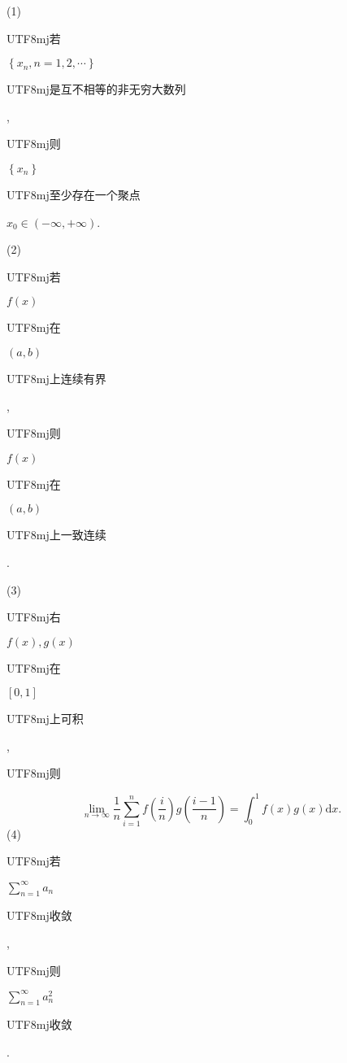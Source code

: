 \documentclass[10pt]{article}
\begin{document}
(1) \begin{CJK}{UTF8}{mj}若\end{CJK} $\left\{x_{n}, n=1,2, \cdots\right\}$ \begin{CJK}{UTF8}{mj}是互不相等的非无穷大数列\end{CJK}, \begin{CJK}{UTF8}{mj}则\end{CJK} $\left\{x_{n}\right\}$ \begin{CJK}{UTF8}{mj}至少存在一个聚点\end{CJK} $x_{0} \in(-\infty,+\infty)$.

(2) \begin{CJK}{UTF8}{mj}若\end{CJK} $f(x)$ \begin{CJK}{UTF8}{mj}在\end{CJK} $(a, b)$ \begin{CJK}{UTF8}{mj}上连续有界\end{CJK}, \begin{CJK}{UTF8}{mj}则\end{CJK} $f(x)$ \begin{CJK}{UTF8}{mj}在\end{CJK} $(a, b)$ \begin{CJK}{UTF8}{mj}上一致连续\end{CJK}.

(3) \begin{CJK}{UTF8}{mj}右\end{CJK} $f(x), g(x)$ \begin{CJK}{UTF8}{mj}在\end{CJK} $[0,1]$ \begin{CJK}{UTF8}{mj}上可积\end{CJK}, \begin{CJK}{UTF8}{mj}则\end{CJK}
$$
\lim _{n \rightarrow \infty} \frac{1}{n} \sum_{i=1}^{n} f\left(\frac{i}{n}\right) g\left(\frac{i-1}{n}\right)=\int_{0}^{1} f(x) g(x) \mathrm{d} x .
$$
(4) \begin{CJK}{UTF8}{mj}若\end{CJK} $\sum_{n=1}^{\infty} a_{n}$ \begin{CJK}{UTF8}{mj}收敛\end{CJK}, \begin{CJK}{UTF8}{mj}则\end{CJK} $\sum_{n=1}^{\infty} a_{n}^{2}$ \begin{CJK}{UTF8}{mj}收敛\end{CJK}.
\end{document}
